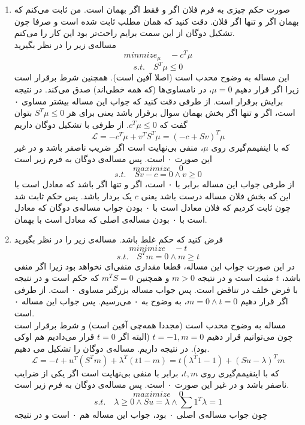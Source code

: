 \begin{enumerate}
	\item 
صورت حکم چیزی به فرم
فلان اگر و فقط اگر بهمان است. من ثابت می‌کنم که بهمان اگر و تنها اگر فلان. دقت کنید که همان مطلب ثابت شده است و صرفا چون تشکیل دوگان از این سمت برایم راحت‌تر بود این کار را می‌کنم.\\
مساله‌ی زیر را در نظر بگیرید
\[
minmize_{\mu} \quad -c^T\mu \]\[
s.t. \quad S^T\mu \le 0
\]
این مساله به وضوح محدب است (اصلا آفین است). همچنین شرط
برقرار است زیرا اگر قرار دهیم
$\mu = 0$،
در نامساوی‌ها (که همه خطی‌اند) صدق می‌کند. در نتیجه 
برایش برقرار است. از طرفی دقت کنید که جواب این مساله بیشتر مساوی ۰ است، اگر و تنها اگر 
بخش بهمان سوال برقرار باشد یعنی برای هر 
$S^T\mu \le 0$
بتوان گفت که 
$c^T\mu \le 0$.
از طرفی با تشکیل دوگان داریم
\[
\mathcal{L} = -c^T\mu + v^TS^T\mu = (-c + Sv)^T\mu
\]
که با اینفیمم‌گیری روی $\mu$، منفی بی‌نهایت است اگر ضریب ناصفر باشد و در غیر این صورت ۰ است. پس مساله‌ی دوگان به فرم زیر است
\[
maximize \quad 0 \]\[
s.t. \quad Sv - c = 0 \land v \ge 0
\]
از طرفی جواب این مساله برابر با ۰ است، اگر و تنها اگر  باشد که معادل است با این که بخش فلان مساله درست باشد یعنی
$c$
یک بردار 
باشد. پس حکم ثابت شد چون ثابت کردیم که فلان معادل است با ۰ بودن جواب مساله‌ی دوگان که معادل است با 
 ۰ بودن مساله‌ی اصلی که معادل است با بهمان.
\item 
فرض کنید که حکم غلط باشد. مساله‌ی زیر را در نظر بگیرید
\[
minimize \quad -t\]\[
s.t. \quad S^Tm = 0 \land m \ge t
\]
در این صورت جواب این مساله، قطعا مقداری منفی‌ای نخواهد بود زیرا اگر منفی باشد، $t$ مثبت است و در نتیجه 
$m > 0$
و همچنین
$m^TS = 0$
که حکم است و در نتیجه با فرض خلف در تناقض است. پس جواب مساله بزرگتر مساوی ۰ است. از طرفی اگر قرار دهیم
$m = 0 \land t = 0$،
به وضوح به ۰ می‌رسیم. پس جواب این مساله ۰ است.\\
مساله به وضوح محدب است (مجددا همه‌چی آفین است) و شرط 
برقرار است چون می‌توانیم قرار دهیم
$t = -1, m = 0$
(البته اگر $t=0$ قرار می‌دادیم هم اوکی بود). در نتیجه 
داریم. مساله‌ی دوگان را تشکیل می دهیم.
\[
\mathcal{L} = -t + u^T(S^Tm) + \lambda^T(t1 - m) = 
t(\lambda^T1 - 1) + (Su - \lambda)^Tm 
\]
که با اینفیمم‌گیری روی $t, m$، برابر با منفی بی‌نهایت است اگر یکی از ضرایب ناصفر باشد و در غیر این صورت ۰ است. پس مساله‌ی دوگان به فرم زیر است.
\[
maximize \quad 0\]\[
s.t. \quad \lambda \ge 0 \land Su = \lambda \land \sum 1^T\lambda = 1
\]
چون جواب مساله‌ی اصلی ۰ بود، جواب این مساله هم ۰ است و در نتیجه

\end{enumerate}
